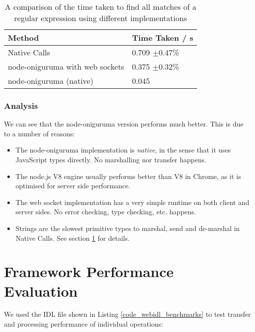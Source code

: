 \begin{table}[h]
\centering
\begin{tabular}{l|l}
\textbf{Method}                 & \textbf{Time Taken / s} \\ \hline
Native Calls                    &  0.709 $\pm$0.47\%  \\
node-oniguruma with web sockets &  0.375 $\pm$0.32\%  \\
node-oniguruma (native)         &  0.045                  
\end{tabular}
\caption{A comparison of the time taken to find all matches of a regular expression using different implementations}
\label{table:onig_time_taken}
\end{table}


\subsubsection{Analysis} %
\label{ssub:onig_analysis}
We can see that the node-oniguruma version performs much better. This is due to a number of reasons:
\begin{itemize}
  \item The node-oniguruma implementation is \emph{native}, in the sense that it uses JavaScript types directly. No marshalling nor transfer happens.
  \item The node.js V8 engine usually performs better than V8 in Chrome, as it is optimised for server side performance.
  \item The web socket implementation has a very simple runtime on both client and server sides. No error checking, type checking, etc. happens.
  \item Strings are the slowest primitive types to marshal, send and de-marshal in Native Calls. See section \ref{sec:performance_evaluation} for details.
\end{itemize}



\section{Framework Performance Evaluation} %
\label{sec:performance_evaluation}
We used the IDL file shown in Listing \ref{code_webidl_benchmarks} to test transfer and processing performance of individual operations:

